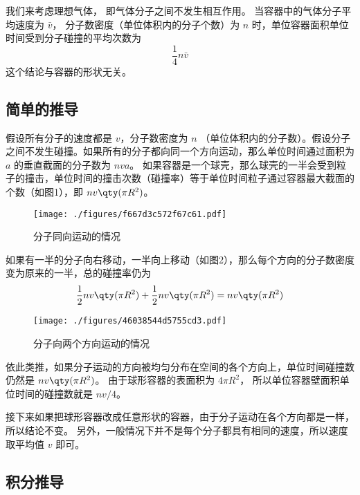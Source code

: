 
\begin{issues}
\issueTODO
\end{issues}


我们来考虑理想气体， 即气体分子之间不发生相互作用。 当容器中的气体分子平均速度为 $\bar v$， 分子数密度（单位体积内的分子个数）为 $n$ 时，单位容器面积单位时间受到分子碰撞的平均次数为
\begin{equation}
\frac14 n\bar v
\end{equation}
这个结论与容器的形状无关。

\subsection{简单的推导}

假设所有分子的速度都是 $v$，分子数密度为 $n$ （单位体积内的分子数）。假设分子之间不发生碰撞。如果所有的分子都向同一个方向运动，那么单位时间通过面积为 $a$ 的垂直截面的分子数为 $nva$。 如果容器是一个球壳，那么球壳的一半会受到粒子的撞击，单位时间的撞击次数（碰撞率）等于单位时间粒子通过容器最大截面的个数（如图1），即 $nv \qty(\pi R^2)$。 
\begin{figure}[ht]
\centering
\texttt{[image: ./figures/f667d3c572f67c61.pdf]}
\caption{分子同向运动的情况} \label{fig_AvgHit_1}
\end{figure}
如果有一半的分子向右移动，一半向上移动（如图2），那么每个方向的分子数密度变为原来的一半，总的碰撞率仍为
\begin{equation}
\frac12 nv \qty(\pi R^2) + \frac12 nv \qty(\pi R^2) = nv \qty(\pi R^2)
\end{equation}

\begin{figure}[ht]
\centering
\texttt{[image: ./figures/46038544d5755cd3.pdf]}
\caption{分子向两个方向运动的情况} \label{fig_AvgHit_2}
\end{figure}
依此类推，如果分子运动的方向被均匀分布在空间的各个方向上，单位时间碰撞数仍然是 $nv \qty(\pi R^2)$。
由于球形容器的表面积为 $4\pi R^2$， 所以单位容器壁面积单位时间的碰撞数就是 $nv/4$。 

接下来如果把球形容器改成任意形状的容器，由于分子运动在各个方向都是一样，所以结论不变。 另外，一般情况下并不是每个分子都具有相同的速度，所以速度取平均值 $v$ 即可。

\subsection{积分推导}
